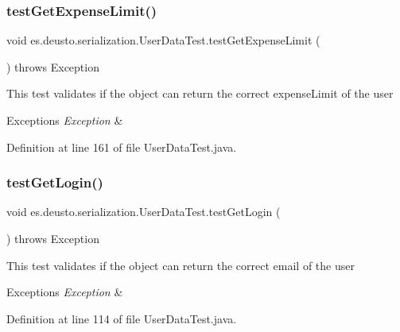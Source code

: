 \subsubsection{\texorpdfstring{test\+Get\+Expense\+Limit()}{testGetExpenseLimit()}}
{\footnotesize\ttfamily void es.\+deusto.\+serialization.\+User\+Data\+Test.\+test\+Get\+Expense\+Limit (\begin{DoxyParamCaption}{ }\end{DoxyParamCaption}) throws Exception}

This test validates if the object can return the correct expense\+Limit of the user 
\begin{DoxyExceptions}{Exceptions}
{\em Exception} & \\
\hline
\end{DoxyExceptions}


Definition at line 161 of file User\+Data\+Test.\+java.

\mbox{\label{classes_1_1deusto_1_1serialization_1_1_user_data_test_a7bee65127b733f7cd3e57839fda83723}} 
\subsubsection{\texorpdfstring{test\+Get\+Login()}{testGetLogin()}}
{\footnotesize\ttfamily void es.\+deusto.\+serialization.\+User\+Data\+Test.\+test\+Get\+Login (\begin{DoxyParamCaption}{ }\end{DoxyParamCaption}) throws Exception}

This test validates if the object can return the correct email of the user 
\begin{DoxyExceptions}{Exceptions}
{\em Exception} & \\
\hline
\end{DoxyExceptions}


Definition at line 114 of file User\+Data\+Test.\+java.

\mbox{\label{classes_1_1deusto_1_1serialization_1_1_user_data_test_a7219ec968af5364963f2868497d8a6af}} 
